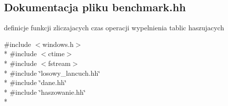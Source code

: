 \hypertarget{benchmark_8hh}{}\subsection{Dokumentacja pliku benchmark.\+hh}
\label{benchmark_8hh}


definicje funkcji zliczajacych czas operacji wypelnienia tablic haszujacych  


{\ttfamily \#include $<$windows.\+h$>$}\\*
{\ttfamily \#include $<$ctime$>$}\\*
{\ttfamily \#include $<$fstream$>$}\\*
{\ttfamily \#include \char`\"{}losowy\+\_\+lancuch.\+hh\char`\"{}}\\*
{\ttfamily \#include \char`\"{}dane.\+hh\char`\"{}}\\*
{\ttfamily \#include \char`\"{}haszowanie.\+hh\char`\"{}}\\*
